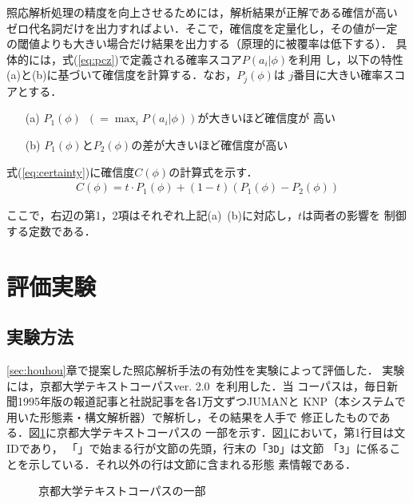 照応解析処理の精度を向上させるためには，解析結果が正解である確信が高い
ゼロ代名詞だけを出力すればよい．そこで，確信度を定量化し，その値が一定
の閾値よりも大きい場合だけ結果を出力する（原理的に被覆率は低下する）．
具体的には，式(\ref{eq:pcz})で定義される確率スコア$P(a_i|\phi)$を利用
し，以下の特性(a)と(b)に基づいて確信度を計算する．なお，$P_j(\phi)$は
$j$番目に大きい確率スコアとする．

\begin{flushleft}
  \begin{itemize}
  \item [(a)] $P_1(\phi)$~$(=\max_i P(a_i|\phi))$が大きいほど確信度が
    高い
  \item [(b)] $P_1(\phi)$と$P_2(\phi)$の差が大きいほど確信度が高い
  \end{itemize}
\end{flushleft}

\noindent
式(\ref{eq:certainty})に確信度$C(\phi)$の計算式を示す．
\begin{eqnarray}
  \label{eq:certainty}
  C(\phi) = t\cdot P_1(\phi)+(1-t)(P_1(\phi)-P_2(\phi))
\end{eqnarray}

\noindent
ここで，右辺の第1，2項はそれぞれ上記(a)~(b)に対応し，$t$は両者の影響を
制御する定数である．

\section{評価実験}
\label{sec:jikken}

\subsection{実験方法}
\label{sec:data}

\ref{sec:houhou}章で提案した照応解析手法の有効性を実験によって評価した．
実験には，京都大学テキストコーパスver. 2.0~\cite{kuro98}を利用した．当
コーパスは，毎日新聞1995年版の報道記事と社説記事を各1万文ずつJUMANと
KNP（本システムで用いた形態素・構文解析器）で解析し，その結果を人手で
修正したものである．図\ref{fig:kd-corpus}に京都大学テキストコーパスの
一部を示す．\mbox{図\ref{fig:kd-corpus}}において，第1行目は文IDであり，
「{\tt *}」で始まる行が文節の先頭，行末の「{\tt 3D}」は文節
「{\tt 3}」に係ることを示している．それ以外の行は文節に含まれる形態
素情報である．

\begin{figure}[htbp]
\begin{center}
\caption{京都大学テキストコーパスの一部}
\label{fig:kd-corpus}

\end{center}
\end{figure}

